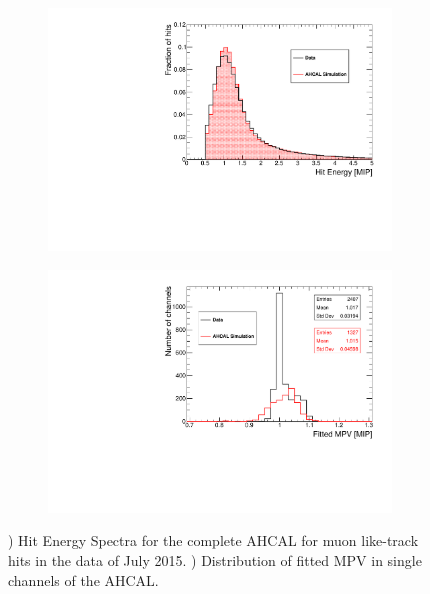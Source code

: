 \begin{figure}[htbp!]
	\begin{subfigure}[t]{0.5\textwidth}
		\centering
		\includegraphics[width=1\linewidth]{../Thesis_Plots/EnergyCalib/Plots/ComparisonMCData_MIPPeak.pdf}
		\caption{} \label{fig:MIPData_MC}
	\end{subfigure}
	\hfill
	\begin{subfigure}[t]{0.5\textwidth}
		\centering
		\includegraphics[width=1\linewidth]{../Thesis_Plots/EnergyCalib/Plots/ComparisonMCData_MPV.pdf}
		\caption{} \label{fig:MPVData_MC}
	\end{subfigure}
	\caption{) Hit Energy Spectra for the complete AHCAL for muon like-track hits in the data of July 2015. ) Distribution of fitted MPV in single channels of the AHCAL.}
\end{figure}

